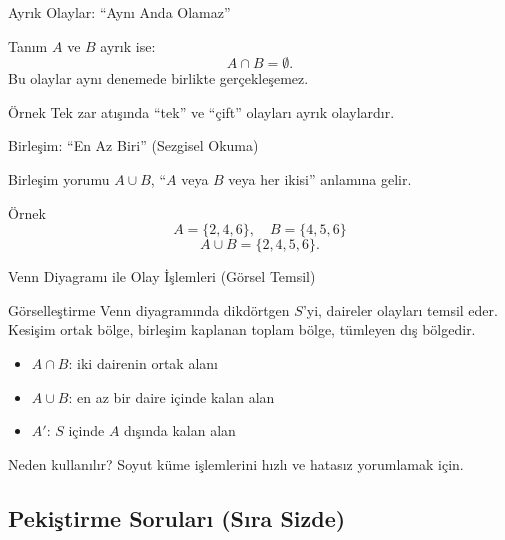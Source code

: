 \documentclass[light]{lutbeamer}
\begin{document}
\begin{frame}{Ayrık Olaylar: ``Aynı Anda Olamaz''}
    \begin{block}{Tanım}
        $A$ ve $B$ ayrık ise:
        \[
            A\cap B=\emptyset.
        \]
        Bu olaylar aynı denemede birlikte gerçekleşemez.
    \end{block}

    \begin{exampleblock}{Örnek}
        Tek zar atışında ``tek'' ve ``çift'' olayları ayrık olaylardır.
    \end{exampleblock}
\end{frame}

\begin{frame}{Birleşim: ``En Az Biri'' (Sezgisel Okuma)}
    \begin{block}{Birleşim yorumu}
        $A\cup B$, ``$A$ veya $B$ veya her ikisi'' anlamına gelir.
    \end{block}

    \begin{exampleblock}{Örnek}
        \[
            A=\{2,4,6\},\quad B=\{4,5,6\}
        \]
        \[
            A\cup B=\{2,4,5,6\}.
        \]
    \end{exampleblock}
\end{frame}

\begin{frame}{Venn Diyagramı ile Olay İşlemleri (Görsel Temsil)}
    \begin{block}{Görselleştirme}
        Venn diyagramında dikdörtgen $S$'yi, daireler olayları temsil eder.
        Kesişim ortak bölge, birleşim kaplanan toplam bölge, tümleyen dış bölgedir.
    \end{block}

    \begin{itemize}
        \item $A\cap B$: iki dairenin ortak alanı
        \item $A\cup B$: en az bir daire içinde kalan alan
        \item $A'$: $S$ içinde $A$ dışında kalan alan
    \end{itemize}

    \begin{alertblock}{Neden kullanılır?}
        Soyut küme işlemlerini hızlı ve hatasız yorumlamak için.
    \end{alertblock}
\end{frame}

\subsection{Pekiştirme Soruları (Sıra Sizde)}
\end{document}
